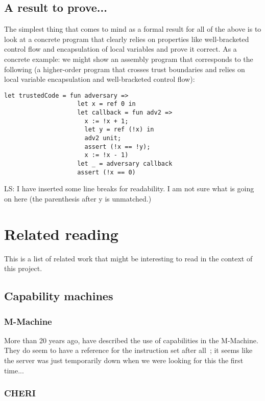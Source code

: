 \documentclass{article}
\newcommand\lau[1]{{\color{purple} \sf \footnotesize {LS: #1}}\\}
\begin{document}
\subsection{A result to prove...}
\label{sec:os-less-stack-property}

The simplest thing that comes to mind as a formal result for all of the above is
to look at a concrete program that clearly relies on properties like
well-bracketed control flow and encapsulation of local variables and prove it
correct. As a concrete example: we might show an assembly program that
corresponds to the following (a higher-order program that crosses trust
boundaries and relies on local variable encapsulation and well-bracketed control
flow):
\begin{verbatim}
let trustedCode = fun adversary =>
                    let x = ref 0 in
                    let callback = fun adv2 => 
                      x := !x + 1; 
                      let y = ref (!x) in 
                      adv2 unit; 
                      assert (!x == !y); 
                      x := !x - 1)
                    let _ = adversary callback
                    assert (!x == 0)
\end{verbatim}
\lau{I have inserted some line breaks for readability. I am not sure what is going on here (the parenthesis after y is unmatched.)}
\section{Related reading}
\label{sec:related-reading}

This is a list of related work that might be interesting to read in the context
of this project.

\subsection{Capability machines}
\label{sec:rw-cap-machines}

\subsubsection{M-Machine}
More than 20 years ago, \cite{Carter:1994:HSF:195473.195579} have described the
use of capabilities in the M-Machine. They do seem to have a reference for the
instruction set after all~\citep{Dally1997Memo59}; it seems like the server was
just temporarily down when we were looking for this the first time...

\subsubsection{CHERI}
\end{document}

